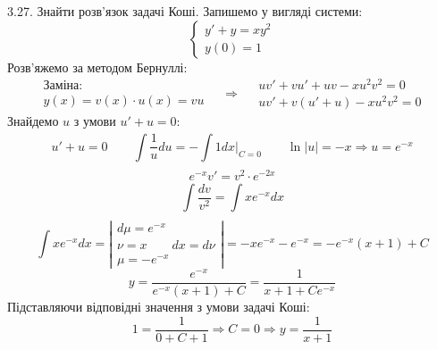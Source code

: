 \documentclass[14pt,a4paper]{scrartcl}
\theoremstyle{definition}
\theoremstyle{remark}
\theoremstyle{definition}
\theoremstyle{definition}
\begin{document}
3.27. Знайти розв'язок задачі Коші. Запишемо у вигляді системи:
$$
\left\lbrace
\begin{gathered}
 y'  + y = xy^2\\
  y(0) = 1
\end{gathered} \right.
$$
Розв'яжемо за методом Бернуллі:
$$
\begin{gathered}
\text{Заміна:}\\
y(x) = v(x)\cdot u(x) = vu
\end{gathered}
\quad \Longrightarrow \quad
\begin{gathered}
 uv' + vu' + uv - xu^2v^2 = 0 \\
 uv' + v(u' + u) - xu^2v^2 = 0
\end{gathered}
$$
Знайдемо $u$ з умови $u' + u =0$:
$$
u' + u =0 \qquad  \int\limits_{}^{}{ \frac{1}{u} du}  =  -\int\limits_{}^{}{1 dx} \Big|_{C=0} \qquad \ln{ \left| u \right| } = -x \Longrightarrow u = e^{-x}
$$
$$
e^{-x}v' = v^2 \cdot e^{-2x}
$$
$$
 \int\limits_{}^{}{ \frac{dv}{v^2} } =  \int\limits_{}^{}{ x e^{-x}dx }
$$
$$
\int\limits_{}^{}{ x e^{-x}dx } = \left| \begin{gathered}
 d\mu =  e^{-x} \\
 \nu = x \qquad dx = d\nu\\
 \mu =  - e^{-x}
\end{gathered} \right| = -xe^{-x} -e^{-x} = -e^{-x} (x+1) + C
$$
$$
y = \frac{e^{-x}}{ e^{-x} (x+1) +C} = \frac{1}{x+1 + Ce^{-x}}
$$
Підставляючи відповідні значення з умови задачі Коші:
$$
1 = \frac{1}{ 0 + C + 1}  \Longrightarrow  C = 0 \Longrightarrow y = \frac{1}{x+1}
$$

\pagebreak
\end{document}
